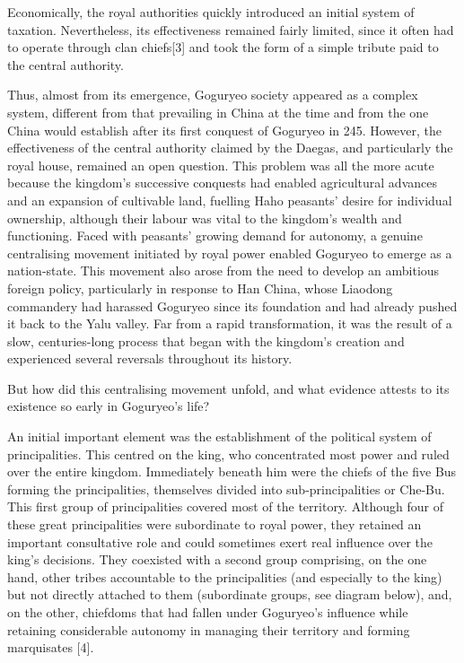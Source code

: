 \documentclass[11pt,a4paper]{article}
\begin{document}
Economically, the royal authorities quickly introduced an initial system of taxation. Nevertheless, its effectiveness remained fairly limited, since it often had to operate through clan chiefs{[}3{]} and took the form of a simple tribute paid to the central authority.

Thus, almost from its emergence, Goguryeo society appeared as a complex system, different from that prevailing in China at the time and from the one China would establish after its first conquest of Goguryeo in 245. However, the effectiveness of the central authority claimed by the Daegas, and particularly the royal house, remained an open question. This problem was all the more acute because the kingdom's successive conquests had enabled agricultural advances and an expansion of cultivable land, fuelling Haho peasants' desire for individual ownership, although their labour was vital to the kingdom's wealth and functioning. Faced with peasants' growing demand for autonomy, a genuine centralising movement initiated by royal power enabled Goguryeo to emerge as a nation-state. This movement also arose from the need to develop an ambitious foreign policy, particularly in response to Han China, whose Liaodong commandery had harassed Goguryeo since its foundation and had already pushed it back to the Yalu valley. Far from a rapid transformation, it was the result of a slow, centuries-long process that began with the kingdom's creation and experienced several reversals throughout its history.

But how did this centralising movement unfold, and what evidence attests to its existence so early in Goguryeo's life?

An initial important element was the establishment of the political system of principalities. This centred on the king, who concentrated most power and ruled over the entire kingdom. Immediately beneath him were the chiefs of the five Bus forming the principalities, themselves divided into sub-principalities or Che-Bu. This first group of principalities covered most of the territory. Although four of these great principalities were subordinate to royal power, they retained an important consultative role and could sometimes exert real influence over the king's decisions. They coexisted with a second group comprising, on the one hand, other tribes accountable to the principalities (and especially to the king) but not directly attached to them (subordinate groups, see diagram below), and, on the other, chiefdoms that had fallen under Goguryeo's influence while retaining considerable autonomy in managing their territory and forming marquisates {[}4{]}.
\end{document}
